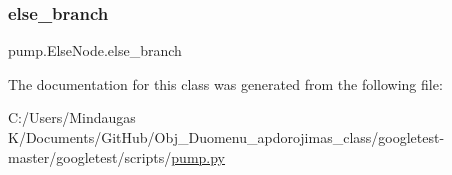 \subsubsection{\texorpdfstring{else\_branch}{else\_branch}}
{\footnotesize\ttfamily pump.\+Else\+Node.\+else\+\_\+branch}



The documentation for this class was generated from the following file\+:\begin{DoxyCompactItemize}
\item 
C\+:/\+Users/\+Mindaugas K/\+Documents/\+Git\+Hub/\+Obj\+\_\+\+Duomenu\+\_\+apdorojimas\+\_\+class/googletest-\/master/googletest/scripts/\mbox{\hyperlink{googletest-master_2googletest_2scripts_2pump_8py}{pump.\+py}}\end{DoxyCompactItemize}
